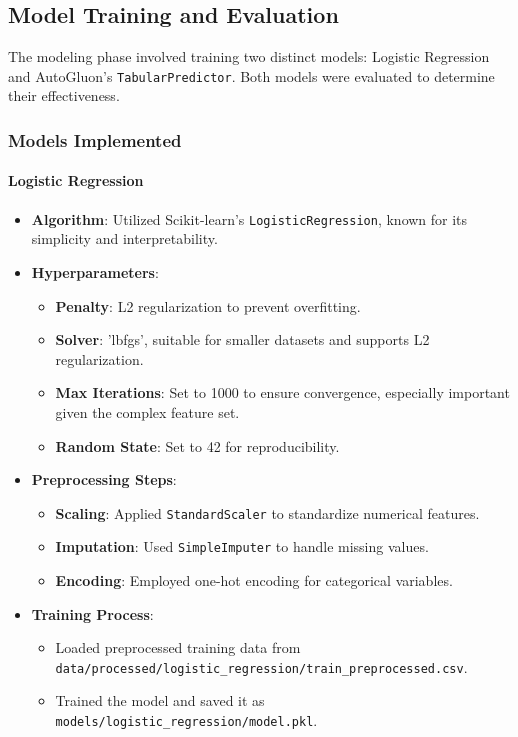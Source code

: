 \documentclass{article}
\begin{document}
\subsection{Model Training and Evaluation}

The modeling phase involved training two distinct models: Logistic Regression and AutoGluon's \texttt{TabularPredictor}. Both models were evaluated to determine their effectiveness.

\subsubsection{Models Implemented}

\paragraph{Logistic Regression}

\begin{itemize}[leftmargin=*]
    \item \textbf{Algorithm}: Utilized Scikit-learn's \texttt{LogisticRegression}, known for its simplicity and interpretability.
    \item \textbf{Hyperparameters}:
        \begin{itemize}[leftmargin=*]
            \item \textbf{Penalty}: L2 regularization to prevent overfitting.
            \item \textbf{Solver}: 'lbfgs', suitable for smaller datasets and supports L2 regularization.
            \item \textbf{Max Iterations}: Set to 1000 to ensure convergence, especially important given the complex feature set.
            \item \textbf{Random State}: Set to 42 for reproducibility.
        \end{itemize}
    \item \textbf{Preprocessing Steps}:
        \begin{itemize}[leftmargin=*]
            \item \textbf{Scaling}: Applied \texttt{StandardScaler} to standardize numerical features.
            \item \textbf{Imputation}: Used \texttt{SimpleImputer} to handle missing values.
            \item \textbf{Encoding}: Employed one-hot encoding for categorical variables.
        \end{itemize}
    \item \textbf{Training Process}:
        \begin{itemize}[leftmargin=*]
            \item Loaded preprocessed training data from \texttt{data/processed/logistic\_regression/train\_preprocessed.csv}.
            \item Trained the model and saved it as \texttt{models/logistic\_regression/model.pkl}.
        \end{itemize}
\end{itemize}
\end{document}
